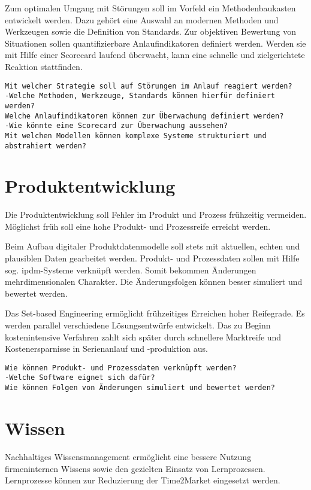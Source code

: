 Zum optimalen Umgang mit Störungen soll im Vorfeld ein Methodenbaukasten entwickelt werden. Dazu gehört eine Auswahl an modernen Methoden und Werkzeugen sowie die Definition von Standards. Zur objektiven Bewertung von Situationen sollen quantifizierbare Anlaufindikatoren definiert werden. Werden sie mit Hilfe einer Scorecard laufend überwacht, kann eine schnelle und zielgerichtete Reaktion stattfinden. 

\begin{verbatim}
Mit welcher Strategie soll auf Störungen im Anlauf reagiert werden? 
-Welche Methoden, Werkzeuge, Standards können hierfür definiert werden? 
Welche Anlaufindikatoren können zur Überwachung definiert werden? 
-Wie könnte eine Scorecard zur Überwachung aussehen? 
Mit welchen Modellen können komplexe Systeme strukturiert und
abstrahiert werden? 
\end{verbatim}


\section{Produktentwicklung}

Die Produktentwicklung soll Fehler im Produkt und Prozess frühzeitig vermeiden. Möglichst früh soll eine hohe Produkt- und Prozessreife erreicht werden. 

Beim Aufbau digitaler Produktdatenmodelle soll stets mit aktuellen, echten und plausiblen Daten gearbeitet werden. Produkt- und Prozessdaten sollen mit Hilfe sog. \gls{ipdm}-Systeme verknüpft werden. Somit bekommen Änderungen mehrdimensionalen Charakter. Die Änderungsfolgen können besser simuliert und bewertet werden. 

Das Set-based Engineering ermöglicht frühzeitiges Erreichen hoher Reifegrade. Es werden parallel verschiedene Lösungsentwürfe entwickelt. Das zu Beginn kostenintensive Verfahren zahlt sich später durch schnellere Marktreife und Kostenersparnisse in Serienanlauf und -produktion aus. 

\begin{verbatim}
Wie können Produkt- und Prozessdaten verknüpft werden? 
-Welche Software eignet sich dafür?
Wie können Folgen von Änderungen simuliert und bewertet werden?
\end{verbatim}


\section{Wissen}

Nachhaltiges Wissensmanagement ermöglicht eine bessere Nutzung firmeninternen Wissens sowie den gezielten Einsatz von Lernprozessen. Lernprozesse können zur Reduzierung der Time2Market eingesetzt werden. 


